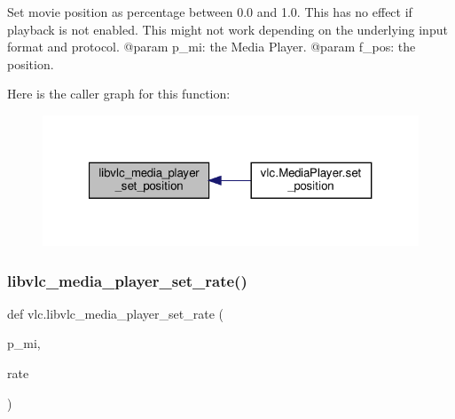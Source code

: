 \begin{DoxyVerb}Set movie position as percentage between 0.0 and 1.0.
This has no effect if playback is not enabled.
This might not work depending on the underlying input format and protocol.
@param p_mi: the Media Player.
@param f_pos: the position.
\end{DoxyVerb}
 Here is the caller graph for this function\+:
\nopagebreak
\begin{figure}[H]
\begin{center}
\leavevmode
\includegraphics[width=321pt]{namespacevlc_a2e1683c42a5d9814960546bf84bf2a6a_icgraph}
\end{center}
\end{figure}
\mbox{\label{namespacevlc_a2b9fb9b6a7652775b6ae4b4cb0782854}} 
\subsubsection{\texorpdfstring{libvlc\+\_\+media\+\_\+player\+\_\+set\+\_\+rate()}{libvlc\_media\_player\_set\_rate()}}
{\footnotesize\ttfamily def vlc.\+libvlc\+\_\+media\+\_\+player\+\_\+set\+\_\+rate (\begin{DoxyParamCaption}\item[{}]{p\+\_\+mi,  }\item[{}]{rate }\end{DoxyParamCaption})}

